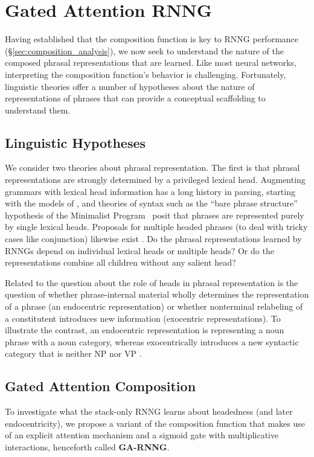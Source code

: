 \documentclass[11pt]{article}
\begin{document}
\section{Gated Attention RNNG}\label{sec:ga_rnng}



Having established that the composition function is key to RNNG performance 
 (\S\ref{sec:composition_analysis}), we now seek to understand the nature of the composed phrasal representations that are learned. Like most neural networks, interpreting the composition function's behavior is challenging. Fortunately, linguistic theories offer a number of hypotheses about the nature of representations of phrases that can provide a conceptual scaffolding to understand them.

\subsection{Linguistic Hypotheses}
We consider two theories about phrasal representation. The first is that phrasal representations are strongly determined by a privileged lexical head. Augmenting grammars with lexical head information has a long history in parsing, starting with the models of , and theories of syntax such as the ``bare phrase structure'' hypothesis of the Minimalist Program~\cite{chomsky:1993} posit that phrases are represented purely by single lexical heads. Proposals for multiple headed phrases (to deal with tricky cases like conjunction) likewise exist \cite{jackendoff:1977,keenan:1987}. Do the phrasal representations learned by RNNGs depend on individual lexical heads or multiple heads? Or do the representations combine all children without any salient head?
 
Related to the question about the role of heads in phrasal representation is the question of whether phrase-internal material wholly determines the representation of a phrase (an endocentric representation) or whether nonterminal relabeling of a constitutent introduces new information (exocentric representations). To illustrate the contrast, an endocentric representation is representing a noun phrase with a noun category, whereas  exocentrically introduces a new syntactic category that is neither NP nor VP \cite{chomsky:1970}.

\subsection{Gated Attention Composition}
To investigate what the stack-only RNNG learns about headedness (and later endocentricity), we propose a variant of the composition function that makes use of an explicit attention mechanism \cite{bahdanau_15} and a sigmoid gate with multiplicative interactions, henceforth called \textbf{GA-RNNG}. 
\end{document}
